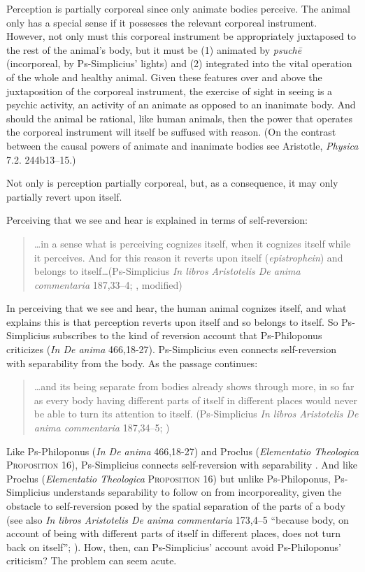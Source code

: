 Perception is partially corporeal since only animate bodies perceive. The animal only has a special sense if it possesses the relevant corporeal instrument. However, not only must this corporeal instrument be appropriately juxtaposed to the rest of the animal's body, but it must be (1) animated by \emph{psuchē} (incorporeal, by Ps-Simplicius' lights) and (2) integrated into the vital operation of the whole and healthy animal. Given these features over and above the juxtaposition of the corporeal instrument, the exercise of sight in seeing is a psychic activity, an activity of an animate as opposed to an inanimate body. And should the animal be rational, like human animals, then the power that operates the corporeal instrument will itself be suffused with reason. (On the contrast between the causal powers of animate and inanimate bodies see Aristotle, \emph{Physica} 7.2. 244b13–15.)

Not only is perception partially corporeal, but, as a consequence, it may only partially revert upon itself.

Perceiving that we see and hear is explained in terms of self-reversion:
\begin{quote}
	\ldots in a sense what is perceiving cognizes itself, when it cognizes itself while it perceives. And for this reason it reverts upon itself (\emph{epistrophein}) and belongs to itself\ldots (Ps-Simplicius \emph{In libros Aristotelis De anima commentaria} 187,33–4; \citealt[40]{Blumenthal:2000rf}, modified)
\end{quote}
In perceiving that we see and hear, the human animal cognizes itself, and what explains this is that perception reverts upon itself and so belongs to itself. So Ps-Simplicius subscribes to the kind of reversion account that Ps-Philoponus criticizes (\emph{In De anima} 466,18-27). Ps-Simplicius even connects self-reversion with separability from the body. As the passage continues:
\begin{quote}
	\ldots and its being separate from bodies already shows through more, in so far as every body having different parts of itself in different places would never be able to turn its attention to itself. (Ps-Simplicius \emph{In libros Aristotelis De anima commentaria} 187,34–5; \citealt[40]{Blumenthal:2000rf})
\end{quote}
Like Ps-Philoponus (\emph{In De anima} 466,18-27) and Proclus (\emph{Elementatio Theologica} \textsc{Prop\-osition} 16), Ps-Simplicius connects self-reversion with separability \citep[125]{Blumenthal:2000rf}. And like Proclus (\emph{Elementatio Theologica} \textsc{Proposition} 16) but unlike Ps-Philoponus, Ps-Simplicius understands separability to follow on from incorporeality, given the obstacle to self-reversion posed by the spatial separation of the parts of a body (see also \emph{In libros Aristotelis De anima commentaria} 173,4–5 ``because body, on account of being with different parts of itself in different places, does not turn back on itself''; \citealt[22]{Blumenthal:2000rf}). How, then, can Ps-Simplicius' account avoid Ps-Philoponus' criticism? The problem can seem acute.

